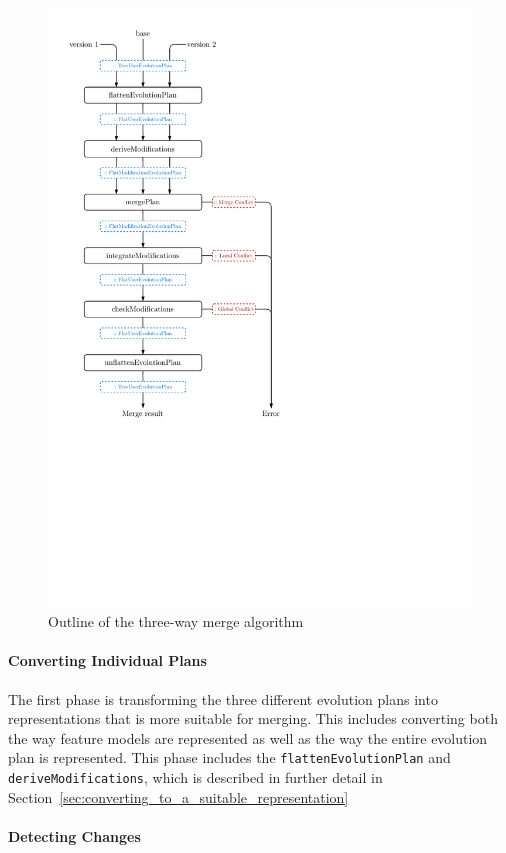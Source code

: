 \documentclass[a4paper,english]{ifimaster}
\begin{document}
\begin{figure}[htbp]
  \centering
  \includegraphics[width=0.8\linewidth]{merge_outline}
  \caption{Outline of the three-way merge algorithm}%
  \label{fig:merge_outline}
\end{figure}

\paragraph{Converting Individual Plans}%
\label{par:converting_individual_plans}

The first phase is transforming the three different evolution plans into representations that is more suitable for merging. This includes converting both the way feature models are represented as well as the way the entire evolution plan is represented. This phase includes the \texttt{flattenEvolutionPlan} and \texttt{deriveModifications}, which is described in further detail in Section~\vref{sec:converting_to_a_suitable_representation}

\paragraph{Detecting Changes}%
\label{par:detecting_changes}
\end{document}
